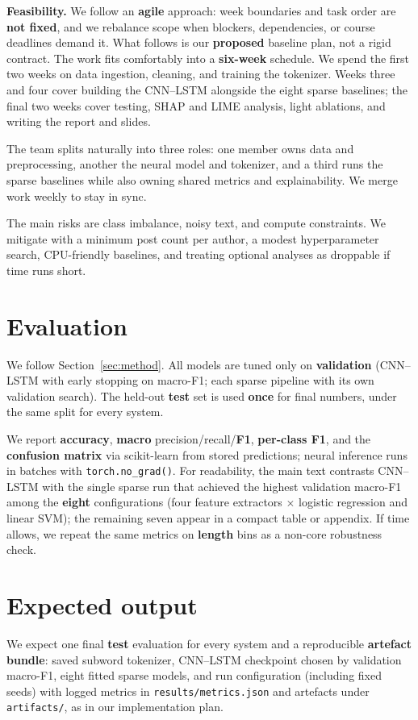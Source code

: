 \documentclass[11pt]{article}
\begin{document}
\noindent\textbf{Feasibility.} We follow an \textbf{agile} approach: week boundaries and task order are \textbf{not fixed}, and we rebalance scope when blockers, dependencies, or course deadlines demand it. What follows is our \textbf{proposed} baseline plan, not a rigid contract. The work fits comfortably into a \textbf{six-week} schedule. We spend the first two weeks on data ingestion, cleaning, and training the tokenizer. Weeks three and four cover building the {CNN}--{LSTM} alongside the eight sparse baselines; the final two weeks cover testing, {SHAP} and {LIME} analysis, light ablations, and writing the report and slides.

\noindent The team splits naturally into three roles: one member owns data and preprocessing, another the neural model and tokenizer, and a third runs the sparse baselines while also owning shared metrics and explainability. We merge work weekly to stay in sync.

\noindent The main risks are class imbalance, noisy text, and compute constraints. We mitigate with a minimum post count per author, a modest hyperparameter search, {CPU}-friendly baselines, and treating optional analyses as droppable if time runs short.

\section{Evaluation}
\label{sec:eval}
We follow Section~\ref{sec:method}. All models are tuned only on \textbf{validation} ({CNN}--{LSTM} with early stopping on macro-{F1}; each sparse pipeline with its own validation search). The held-out \textbf{test} set is used \textbf{once} for final numbers, under the same split for every system.

We report \textbf{accuracy}, \textbf{macro} precision/recall/\textbf{{F1}}, \textbf{per-class {F1}}, and the \textbf{confusion matrix} via scikit-learn from stored predictions; neural inference runs in batches with \texttt{torch.no\_grad()}. For readability, the main text contrasts {CNN}--{LSTM} with the single sparse run that achieved the highest validation macro-{F1} among the \textbf{eight} configurations (four feature extractors $\times$ logistic regression and linear {SVM}); the remaining seven appear in a compact table or appendix. If time allows, we repeat the same metrics on \textbf{length} bins as a non-core robustness check.

\section{Expected output}
\label{sec:expected}
We expect one final \textbf{test} evaluation for every system and a reproducible \textbf{artefact bundle}: saved subword tokenizer, {CNN}--{LSTM} checkpoint chosen by validation macro-{F1}, eight fitted sparse models, and run configuration (including fixed seeds) with logged metrics in \texttt{results/metrics.json} and artefacts under \texttt{artifacts/}, as in our implementation plan.
\end{document}
